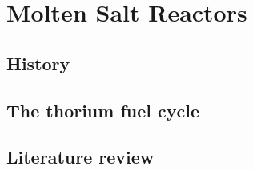 \chapter[Molten Salt Reactors]{Molten Salt Reactors}


\section{History}

\section{The thorium fuel cycle}

\section{Literature review}


